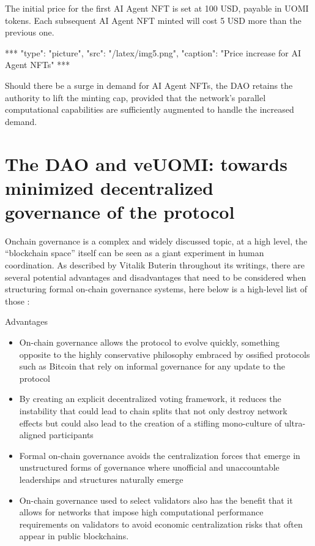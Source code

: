 \documentclass{article}
\begin{document}
The initial price for the first AI Agent NFT is set at 100 USD, payable in UOMI tokens. Each subsequent AI Agent NFT minted will cost 5 USD more than the previous one.



***
"type": "picture",
"src": "/latex/img5.png",
"caption": "Price increase for AI Agent NFTs"
***


Should there be a surge in demand for AI Agent NFTs, the DAO retains the authority to lift the minting cap, provided that the network's parallel computational capabilities are sufficiently augmented to handle the increased demand.






\section{The DAO and veUOMI:  towards minimized decentralized governance of the protocol
}

Onchain governance is a complex and widely discussed topic, at a high level, the “blockchain space” itself can be seen as a giant experiment in human coordination. As described by Vitalik Buterin throughout its writings, there are several potential advantages and disadvantages that need to be considered when structuring formal on-chain governance systems, here below is a high-level list of those :

Advantages 

\begin{itemize}

\item On-chain governance allows the protocol to evolve quickly, something opposite to the highly conservative philosophy embraced by ossified protocols such as Bitcoin that rely on informal governance for any update to the protocol

\item By creating an explicit decentralized voting framework, it reduces the instability that could lead to chain splits that not only destroy network effects but could  also lead to the creation of a stifling mono-culture of ultra-aligned participants 

\item Formal on-chain governance avoids the centralization forces that emerge in  unstructured forms of governance where unofficial and unaccountable leaderships and structures naturally emerge

\item On-chain governance used to select validators also has the benefit that it allows for networks that impose high computational performance requirements on validators to avoid economic centralization risks that often appear in public blockchains.

\end{itemize}
\end{document}
